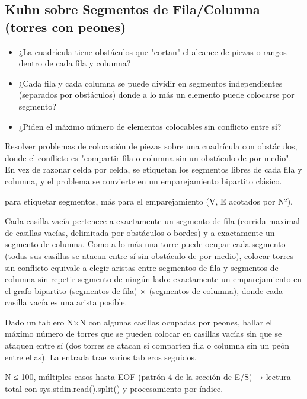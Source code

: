 \subsection{Kuhn sobre Segmentos de Fila/Columna (torres con peones)}
\label{alg:4-2}


\begin{itemize}
\item ¿La cuadrícula tiene obstáculos que "cortan" el alcance de piezas o rangos dentro de cada fila y columna?
\item ¿Cada fila y cada columna se puede dividir en segmentos independientes (separados por obstáculos) donde a lo más un elemento puede colocarse por segmento?
\item ¿Piden el máximo número de elementos colocables sin conflicto entre sí?
\end{itemize}

 Resolver problemas de colocación de piezas sobre una cuadrícula con obstáculos, donde el conflicto es "compartir fila o columna sin un obstáculo de por medio". En vez de razonar celda por celda, se etiquetan los segmentos libres de cada fila y columna, y el problema se convierte en un emparejamiento bipartito clásico.

  para etiquetar segmentos, más  para el emparejamiento (V, E acotados por N²).

 Cada casilla vacía pertenece a exactamente un segmento de fila (corrida maximal de casillas vacías, delimitada por obstáculos o bordes) y a exactamente un segmento de columna. Como a lo más una torre puede ocupar cada segmento (todas sus casillas se atacan entre sí sin obstáculo de por medio), colocar torres sin conflicto equivale a elegir aristas entre segmentos de fila y segmentos de columna sin repetir segmento de ningún lado: exactamente un emparejamiento en el grafo bipartito (segmentos de fila) × (segmentos de columna), donde cada casilla vacía es una arista posible.


Dado un tablero N×N con algunas casillas ocupadas por peones, hallar el máximo número de torres que se pueden colocar en casillas vacías sin que se ataquen entre sí (dos torres se atacan si comparten fila o columna sin un peón entre ellas). La entrada trae varios tableros seguidos.

 N ≤ 100, múltiples casos hasta EOF (patrón 4 de la sección de E/S) → lectura total con sys.stdin.read().split() y procesamiento por índice.

